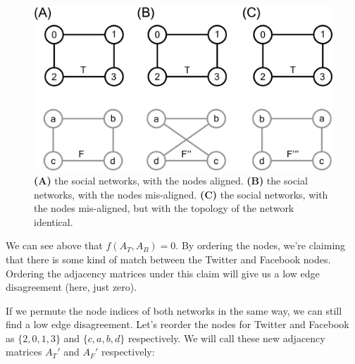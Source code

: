 \begin{figure}[h]
    \centering
    \includegraphics[width=\linewidth]{applications/ch8/Images/gm_ex.png}
    \caption[Social network $4$ node graph matching example]{\textbf{(A)} the social networks, with the nodes aligned. \textbf{(B)} the social networks, with the nodes mis-aligned. \textbf{(C)} the social networks, with the nodes mis-aligned, but with the topology of the network identical.}
    \label{fig:ch8:gm:ex}
\end{figure}
    
We can see above that $f(A_T, A_B) = 0$. By ordering the nodes, we're claiming that there is some kind of match between the Twitter and Facebook nodes. Ordering the adjacency matrices under this claim will give us a low edge disagreement (here, just zero). 

If we permute the node indices of both networks in the same way, we can still find a low edge disagreement. Let's reorder the nodes for Twitter and Facebook as $\{2, 0, 1, 3\}$ and $\{c, a, b, d\}$ respectively. We will call these new adjacency matrices $A_T'$ and $A_F'$ respectively:

